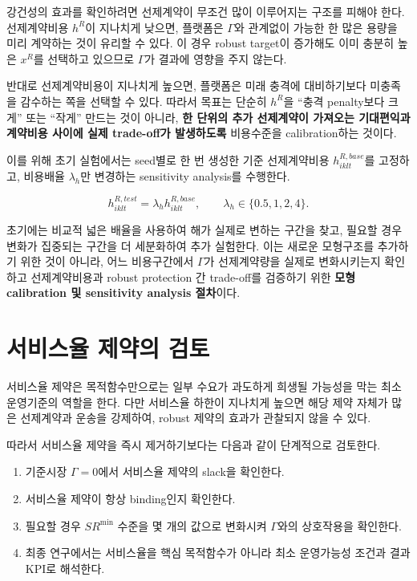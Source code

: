 \documentclass[11pt,a4paper]{article}
\begin{document}
강건성의 효과를 확인하려면 선제계약이 무조건 많이 이루어지는 구조를 피해야 한다.
선제계약비용 $h^R$이 지나치게 낮으면,
플랫폼은 $\Gamma$와 관계없이 가능한 한 많은 용량을 미리 계약하는 것이 유리할 수 있다.
이 경우 robust target이 증가해도 이미 충분히 높은 $x^R$를 선택하고 있으므로
$\Gamma$가 결과에 영향을 주지 않는다.

반대로 선제계약비용이 지나치게 높으면,
플랫폼은 미래 충격에 대비하기보다 미충족을 감수하는 쪽을 선택할 수 있다.
따라서 목표는 단순히 $h^R$을 ``충격 penalty보다 크게'' 또는 ``작게'' 만드는 것이 아니라,
\textbf{한 단위의 추가 선제계약이 가져오는 기대편익과 계약비용 사이에 실제 trade-off가 발생하도록}
비용수준을 calibration하는 것이다.

이를 위해 초기 실험에서는 seed별로 한 번 생성한 기준 선제계약비용 $h^{R,base}_{iklt}$를 고정하고,
비용배율 $\lambda_h$만 변경하는 sensitivity analysis를 수행한다.

\[
h^{R,test}_{iklt}=\lambda_h h^{R,base}_{iklt},
\qquad
\lambda_h\in\{0.5,1,2,4\}.
\]

초기에는 비교적 넓은 배율을 사용하여 해가 실제로 변하는 구간을 찾고,
필요할 경우 변화가 집중되는 구간을 더 세분화하여 추가 실험한다.
이는 새로운 모형구조를 추가하기 위한 것이 아니라,
어느 비용구간에서 $\Gamma$가 선제계약량을 실제로 변화시키는지 확인하고
선제계약비용과 robust protection 간 trade-off를 검증하기 위한
\textbf{모형 calibration 및 sensitivity analysis 절차}이다.

\section{서비스율 제약의 검토}

서비스율 제약은 목적함수만으로는 일부 수요가 과도하게 희생될 가능성을 막는
최소 운영기준의 역할을 한다.
다만 서비스율 하한이 지나치게 높으면
해당 제약 자체가 많은 선제계약과 운송을 강제하여,
robust 제약의 효과가 관찰되지 않을 수 있다.

따라서 서비스율 제약을 즉시 제거하기보다는 다음과 같이 단계적으로 검토한다.

\begin{enumerate}[label=\arabic*)]
    \item 기준시장 $\Gamma=0$에서 서비스율 제약의 slack을 확인한다.
    \item 서비스율 제약이 항상 binding인지 확인한다.
    \item 필요할 경우 $SR^{\min}$ 수준을 몇 개의 값으로 변화시켜 $\Gamma$와의 상호작용을 확인한다.
    \item 최종 연구에서는 서비스율을 핵심 목적함수가 아니라 최소 운영가능성 조건과 결과 KPI로 해석한다.
\end{enumerate}
\end{document}
